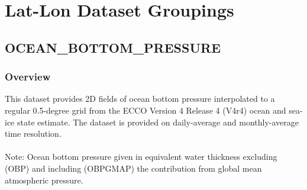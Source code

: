 \section{Lat-Lon Dataset Groupings}
\subsection{OCEAN\_BOTTOM\_PRESSURE}
\subsubsection{Overview}
\newp
This dataset provides 2D fields of ocean bottom pressure interpolated to a regular 0.5-degree grid from the ECCO Version 4 Release 4 (V4r4) ocean and sea-ice state estimate. The dataset is provided on daily-average and monthly-average time resolution.
\\\\
Note: Ocean bottom pressure given in equivalent water thickness excluding (OBP) and including (OBPGMAP) the contribution from global mean atmospheric pressure.
\\

